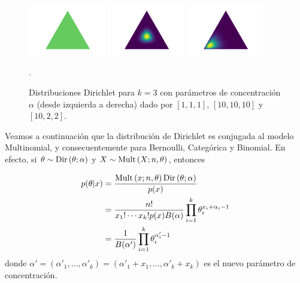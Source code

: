 \begin{figure}[h]
\includegraphics[width=0.3\textwidth]{img/dirichlet111.png}
\includegraphics[width=0.3\textwidth]{img/dirichlet101010.png}
\includegraphics[width=0.3\textwidth]{img/dirichlet1022.png}
\caption{Distribuciones Dirichlet para $k=3$ con parámetros de concentración $\alpha$ (desde izquierda a derecha) dado por $[1,1,1]$, $[10,10,10]$ y $[10,2,2]$. }.
\label{fig:dist_Dirichlet}
\centering
\end{figure}


Veamos a continuación que la distribución de Dirichlet es conjugada al modelo Multinomial, y consecuentemente para Bernoulli, Categórica y Binomial. En efecto, si $\theta \sim \text{Dir}\left(\theta;\alpha\right)$ y $X\sim\text{Mult}\left(X;n,\theta\right)$, entonces

\begin{align}
	p(\theta|x) &= \frac{\text{Mult}\left(x;n,\theta\right)\text{Dir}\left(\theta;\alpha\right)}{p(x)}\nonumber\\
				&=  \frac{n!}{ x_1!\cdots x_k!p(x) B(\alpha)} \prod_{i=1}^k \theta_i^{x_i + \alpha_i-1}\nonumber\\
				&=  \frac{1}{B(\alpha')} \prod_{i=1}^k \theta_i^{\alpha'_i-1}
				\label{eq:dirichlet_post}
\end{align}
donde $\alpha' = (\alpha'_1,\ldots,\alpha'_k) = (\alpha'_1 + x_1,\ldots,\alpha'_k+ x_k)$ es el nuevo parámetro de concentración.


